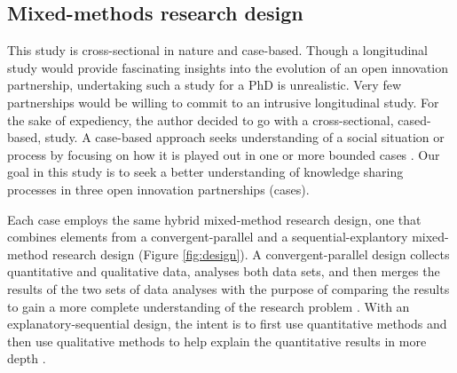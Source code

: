 \subsection{Mixed-methods research design}

This study is cross\hyp{}sectional in nature and case\hyp{}based. Though a longitudinal study would provide fascinating insights into the evolution of an open innovation partnership, undertaking such a study for a PhD is unrealistic. Very few partnerships would be willing to commit to an intrusive longitudinal study. For the sake of expediency, the author decided to go with a cross-sectional, cased-based, study. A case\hyp{}based approach seeks understanding of a social situation or process by focusing on how it is played out in one or more bounded cases \citep{richards2012readme}. Our goal in this study is to seek a better understanding of knowledge sharing processes in three open innovation partnerships (cases). \medskip

Each case employs the same hybrid mixed-method research design, one that combines elements from a convergent\hyp{}parallel and a sequential\hyp{}explantory mixed\hyp{}method research design (Figure \ref{fig:design}). A convergent\hyp{}parallel design collects quantitative and qualitative data, analyses both data sets, and then merges the results of the two sets of data analyses with the purpose of comparing the results to gain a more complete understanding of the research problem \citep{creswell2014concise}. With an explanatory\hyp{}sequential design, the intent is to first use quantitative methods and then use qualitative methods to help explain the quantitative results in more depth \citep{creswell2014concise}. \medskip

